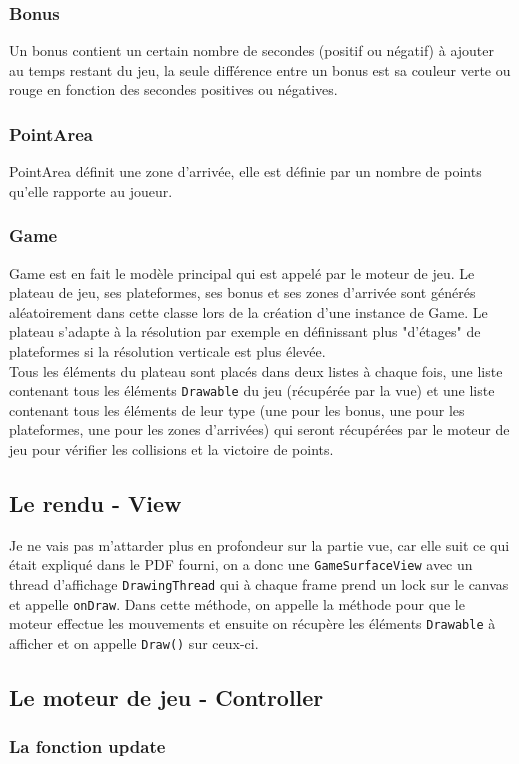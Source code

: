 \documentclass{article}
\begin{document}
\subsubsection{Bonus}
Un bonus contient un certain nombre de secondes (positif ou négatif) à ajouter au temps restant du jeu, la seule différence entre un bonus est sa couleur verte ou rouge en fonction des secondes positives ou négatives.
\subsubsection{PointArea}
PointArea définit une zone d'arrivée, elle est définie par un nombre de points qu'elle rapporte au joueur.
\subsubsection{Game}
Game est en fait le modèle principal qui est appelé par le moteur de jeu. Le plateau de jeu, ses plateformes, ses bonus et ses zones d'arrivée sont générés aléatoirement dans cette classe lors de la création d'une instance de Game. Le plateau s'adapte à la résolution par exemple en définissant plus "d'étages" de plateformes si la résolution verticale est plus élevée.\\

Tous les éléments du plateau sont placés dans deux listes à chaque fois, une liste contenant tous les éléments \verb+Drawable+ du jeu (récupérée par la vue) et une liste contenant tous les éléments de leur type (une pour les bonus, une pour les plateformes, une pour les zones d'arrivées) qui seront récupérées par le moteur de jeu pour vérifier les collisions et la victoire de points.
\subsection{Le rendu - View}
Je ne vais pas m'attarder plus en profondeur sur la partie vue, car elle suit ce qui était expliqué dans le PDF fourni, on a donc une \verb+GameSurfaceView+ avec un thread d'affichage \verb+DrawingThread+ qui à chaque frame prend un lock sur le canvas et appelle \verb+onDraw+. Dans cette méthode, on appelle la méthode pour que le moteur effectue les mouvements et ensuite on récupère les éléments \verb+Drawable+ à afficher et on appelle \verb+Draw()+ sur ceux-ci.
\subsection{Le moteur de jeu - Controller}
\subsubsection{La fonction update}
\end{document}
